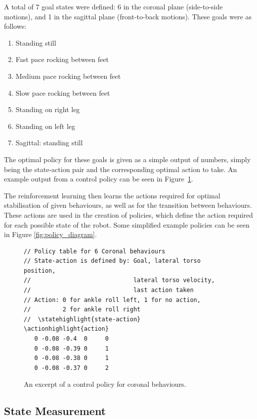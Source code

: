 A total of 7 goal states were defined: 6 in the coronal plane (side-to-side motions), and 1 in the sagittal plane (front-to-back motions). These goals were as follows:

\begin{enumerate}
\item Standing still
\item Fast pace rocking between feet
\item Medium pace rocking between feet
\item Slow pace rocking between feet
\item Standing on right leg
\item Standing on left leg
\item Sagittal: standing still
\end{enumerate}

The optimal policy for these goals is given as a simple output of numbers, simply being the state-action pair and the corresponding optimal action to take. An example output from a control policy can be seen in Figure~\ref{fig:policy}.

The reinforcement learning then learns the actions required for optimal stabilisation of given behaviours, as well as for the transition between behaviours. These actions are used in the creation of policies, which define the action required for each possible state of the robot. Some simplified example policies can be seen in Figure \ref{fig:policy_diagram}.


\begin{figure}[h]
\newcommand\statehighlight[1]{\textcolor[rgb]{1,0,0}{#1}}
\newcommand\actionhighlight[1]{\textcolor[rgb]{0,0,1}{#1}}
\begin{Verbatim}[commandchars=\\\{\},frame=single]
// Policy table for 6 Coronal behaviours
// State-action is defined by: Goal, lateral torso position, 
//                             lateral torso velocity, 
//                             last action taken
// Action: 0 for ankle roll left, 1 for no action, 
//         2 for ankle roll right
//  \statehighlight{state-action}    \actionhighlight{action}
   0 -0.08 -0.4  0     0
   0 -0.08 -0.39 0     1
   0 -0.08 -0.38 0     1
   0 -0.08 -0.37 0     2
\end{Verbatim}
\caption{An excerpt of a control policy for coronal behaviours.}
\label{fig:policy}
\end{figure}

\subsection{State Measurement}

